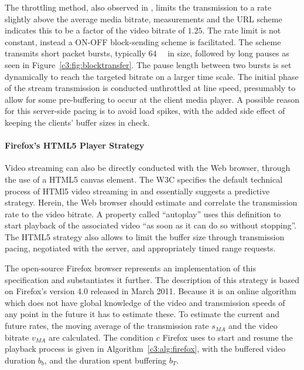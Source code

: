 The throttling method, also observed in \cite{alcock2011afcyt}, limits the transmission to a rate slightly above the average media bitrate, measurements and the \gls{URL} scheme indicates this to be a factor of the video bitrate of $1.25$. The rate limit is not constant, instead a ON-OFF block-sending scheme is facilitated. The scheme transmits short packet bursts, typically \SI{64}{\kibi\byte} in size, followed by long pauses as seen in Figure~\ref{c3:fig:blocktransfer}. The pause length between two bursts is set dynamically to reach the targeted bitrate on a larger time scale. The initial phase of the stream transmission is conducted unthrottled at line speed, presumably to allow for some pre-buffering to occur at the client media player. A possible reason for this server-side pacing is to avoid load spikes, with the added side effect of keeping the clients' buffer sizes in check.


\paragraph{Firefox's HTML5 Player Strategy}

Video streaming can also be directly conducted with the Web browser, through the use of a HTML5 canvas element. The \gls{W3C} specifies the default technical process of HTMl5 video streaming in \cite{html5video} and essentially suggests a predictive strategy. Herein, the Web browser should estimate and correlate the transmission rate to the video bitrate. A property called ``autoplay'' uses this definition to start  playback of the associated video \enquote{as soon as it can do so without stopping}. The HTML5 strategy also allows to limit the buffer size through transmission pacing, negotiated with the server, and appropriately timed range requests.

The open-source Firefox browser represents an implementation of this specification and substantiates it further. The description of this strategy is based on Firefox's version 4.0 released in March 2011. Because it is an online algorithm which does not have global knowledge of the video and transmission speeds of any point in the future it has to estimate these.
To estimate the current and future rates, the moving average of the transmission rate $s_{MA}$ and the video bitrate $v_{MA}$ are calculated. The condition $c$ Firefox uses to start and resume the playback process is given in Algorithm~\ref{c3:alg:firefox}, with the buffered video duration $b_b$, and the duration spent buffering $b_T$.

